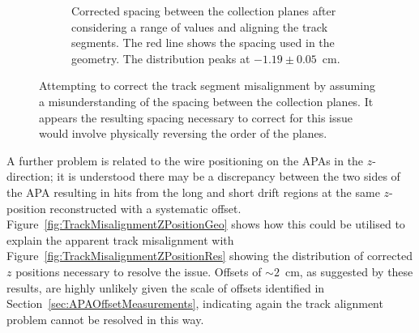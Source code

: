 \begin{figure}
\begin{subfigure}[t]{0.48\linewidth}
    \caption{Corrected spacing between the collection planes after considering a range of values and aligning the track segments.  The red line shows the spacing used in the geometry.  The distribution peaks at $-1.19\pm0.05$~cm.}
    \label{fig:TrackMisalignmentCollectionSpacingRes}
  \end{subfigure}
  \caption[Attempting to correct the track segment misalignment by assuming a misunderstanding of the spacing between the collection planes.]{Attempting to correct the track segment misalignment by assuming a misunderstanding of the spacing between the collection planes.  It appears the resulting spacing necessary to correct for this issue would involve physically reversing the order of the planes.}
  \label{fig:TrackMisalignmentCollectionSpacing}
\end{figure}

A further problem is related to the wire positioning on the APAs in the $z$-direction; it is understood there may be a discrepancy between the two sides of the APA resulting in hits from the long and short drift regions at the same $z$-position reconstructed with a systematic offset.  Figure~\ref{fig:TrackMisalignmentZPositionGeo} shows how this could be utilised to explain the apparent track misalignment with Figure~\ref{fig:TrackMisalignmentZPositionRes} showing the distribution of corrected $z$ positions necessary to resolve the issue.  Offsets of $\sim2$~cm, as suggested by these results, are highly unlikely given the scale of offsets identified in Section~\ref{sec:APAOffsetMeasurements}, indicating again the track alignment problem cannot be resolved in this way.

